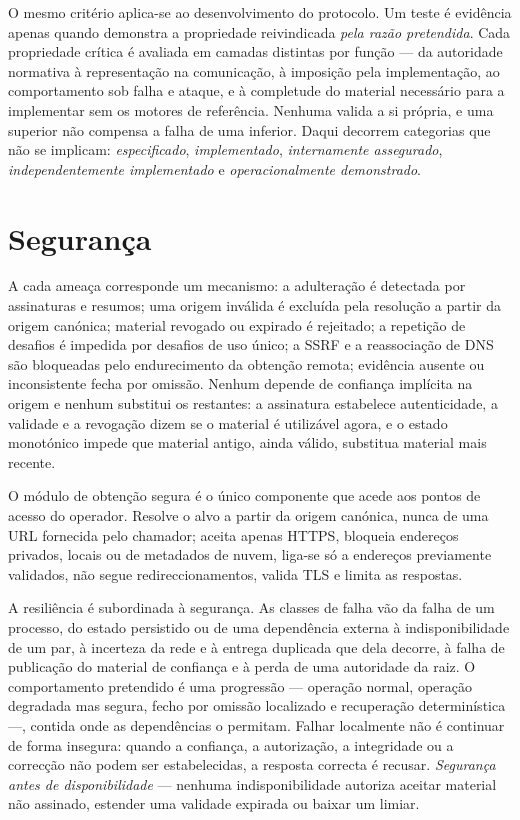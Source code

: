 \documentclass[journal abbreviation, manuscript]{copernicus}
\begin{document}
O mesmo critério aplica-se ao desenvolvimento do protocolo. Um teste é evidência apenas quando demonstra a propriedade reivindicada \emph{pela razão pretendida}. Cada propriedade crítica é avaliada em camadas distintas por função --- da autoridade normativa à representação na comunicação, à imposição pela implementação, ao comportamento sob falha e ataque, e à completude do material necessário para a implementar sem os motores de referência. Nenhuma valida a si própria, e uma superior não compensa a falha de uma inferior. Daqui decorrem categorias que não se implicam: \emph{especificado}, \emph{implementado}, \emph{internamente assegurado}, \emph{independentemente implementado} e \emph{operacionalmente demonstrado}.


\section{Segurança}\label{sec:security}

A cada ameaça corresponde um mecanismo: a adulteração é detectada por assinaturas e resumos; uma origem inválida é excluída pela resolução a partir da origem canónica; material revogado ou expirado é rejeitado; a repetição de desafios é impedida por desafios de uso único; a SSRF e a reassociação de DNS são bloqueadas pelo endurecimento da obtenção remota; evidência ausente ou inconsistente fecha por omissão. Nenhum depende de confiança implícita na origem e nenhum substitui os restantes: a assinatura estabelece autenticidade, a validade e a revogação dizem se o material é utilizável agora, e o estado monotónico impede que material antigo, ainda válido, substitua material mais recente.

O módulo de obtenção segura é o único componente que acede aos pontos de acesso do operador. Resolve o alvo a partir da origem canónica, nunca de uma URL fornecida pelo chamador; aceita apenas HTTPS, bloqueia endereços privados, locais ou de metadados de nuvem, liga-se só a endereços previamente validados, não segue redireccionamentos, valida TLS e limita as respostas.

A resiliência é subordinada à segurança. As classes de falha vão da falha de um processo, do estado persistido ou de uma dependência externa à indisponibilidade de um par, à incerteza da rede e à entrega duplicada que dela decorre, à falha de publicação do material de confiança e à perda de uma autoridade da raiz. O comportamento pretendido é uma progressão --- operação normal, operação degradada mas segura, fecho por omissão localizado e recuperação determinística ---, contida onde as dependências o permitam. Falhar localmente não é continuar de forma insegura: quando a confiança, a autorização, a integridade ou a correcção não podem ser estabelecidas, a resposta correcta é recusar. \emph{Segurança antes de disponibilidade} --- nenhuma indisponibilidade autoriza aceitar material não assinado, estender uma validade expirada ou baixar um limiar.
\end{document}
